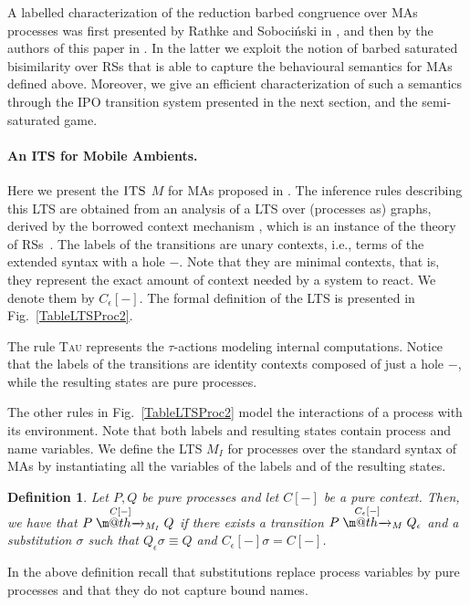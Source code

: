 \documentclass[copyright,creativecommons]{eptcs}
\makeatletter
\def\tr#1{\stackrel{#1}{\to}}
\let\oldrightarrow\to
\renewcommand{\to}[1][]{\ifthenelse{\equal{#1}{}}{\oldrightarrow}{\ensuremath{\xrightarrow{{}_{#1}}}}}
\def \rightarrowfill{\m@th\mathord{\smash-}\mkern-6mu\cleaders\hbox{$\mkern-2mu\mathord{\smash-}\mkern-2mu$}\hfill
  \mkern-6mu\mathord\rightarrow}
\newcommand{\ilts}{\textsc{ITS}}
\def\tr#1{\stackrel{#1}{\rightarrowfill}}
\newcommand{\<}{\langle}
\renewcommand{\>}{\rangle}
\def\tr#1{\stackrel{#1}{\rightarrowfill}}
\def \rightarrowfill{\m@th\mathord{\smash-}\mkern-6mu\cleaders\hbox{$\mkern-2mu\mathord{\smash-}\mkern-2mu$}\hfill
  \mkern-6mu\mathord\rightarrow}
\newtheorem{definition}{Definition}{}
\makeatother
\begin{document}
A labelled characterization of the reduction barbed congruence over
MAs processes was first presented by Rathke and Soboci\'nski in
\cite{PawelAmbient}, and then by the authors of this paper in
\cite{BGMFOSSACS09}.  In the latter we exploit the notion of barbed
saturated bisimilarity over RSs that is able to capture the
behavioural semantics for MAs defined above.  Moreover, we give an
efficient characterization of such a semantics through the IPO
transition system presented in the next section, and the
semi-saturated game.

\paragraph{An ITS for Mobile Ambients.}
Here we present the $\ilts$ $M$ for MAs proposed in
\cite{BoGaMo}. The inference rules describing this LTS
are obtained
from an analysis of a LTS over (processes as) graphs, derived by the
borrowed context mechanism \cite{EK:06}, which is an instance of the
theory of RSs~\cite{graphslics}.  The labels of the
transitions are unary contexts, i.e., terms of the extended syntax
with a hole $-$. Note that they are minimal contexts, that is, they
represent the exact amount of context needed by a system to react.  We
denote them by $C_\epsilon[-]$.  The formal definition of the LTS is
presented in Fig.~\ref{TableLTSProc2}.

The rule \textsc{Tau} represents the $\tau$-actions
modeling internal computations.  Notice that the labels of the
transitions are identity contexts composed of just a hole $-$, while the
resulting states are pure processes.


The other rules in Fig.~\ref{TableLTSProc2} model the interactions of
a process with its environment. Note that both labels and resulting
states contain process and name variables.  We define the LTS
$M_I$ for processes over the standard syntax of MAs by
instantiating all the variables of the labels and of the resulting
states.

\begin{definition}
\label{instance}
Let $P,Q$ be pure processes and let $C[-]$ be a pure context.  Then,
we have that $P \tr{C[-]}_{M_I} Q$ if there exists a
transition $P \tr{C_\epsilon[-]}_{M} Q_\epsilon$ and a
substitution $\sigma$ such that $Q_\epsilon \sigma \equiv Q$ and
$C_\epsilon[-] \sigma = C[-]$.
\end{definition}

In the above definition recall that substitutions replace process
variables by pure processes and that they do not capture bound names.
\end{document}
